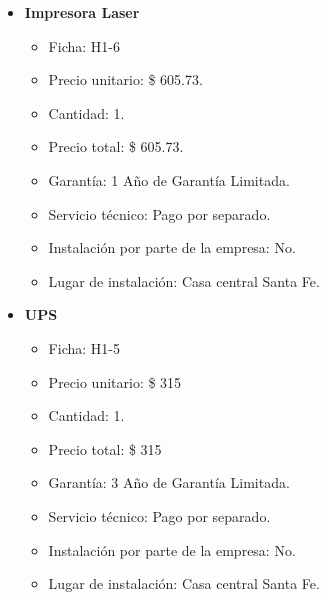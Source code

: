 \begin{itemize}
  \item \textbf{Impresora Laser}
    \begin{itemize}
      \item Ficha: H1-6
      \item Precio unitario: \$ 605.73.
      \item Cantidad: 1.
      \item Precio total: \$ 605.73.
      \item Garantía: 1 Año de Garantía Limitada.
      \item Servicio técnico: Pago por separado.
      \item Instalación por parte de la empresa: No.
      \item Lugar de instalación: Casa central Santa Fe.
    \end{itemize}

  \item \textbf{UPS}
    \begin{itemize}
      \item Ficha: H1-5
      \item Precio unitario: \$ 315
      \item Cantidad: 1.
      \item Precio total: \$ 315
      \item Garantía: 3 Año de Garantía Limitada.
      \item Servicio técnico: Pago por separado.
      \item Instalación por parte de la empresa: No.
      \item Lugar de instalación: Casa central Santa Fe.
    \end{itemize}

\end{itemize}

